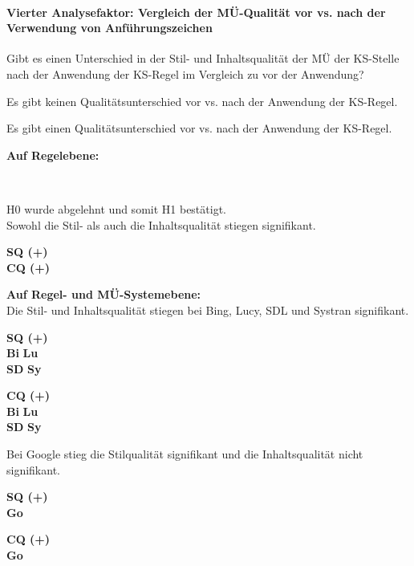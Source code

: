 \paragraph*{Vierter Analysefaktor: Vergleich der MÜ-Qualität vor vs. nach der Verwendung von Anführungszeichen}
\begin{description}[font=\normalfont\bfseries]
\item[Fragestellung:] Gibt es einen Unterschied in der Stil- und Inhaltsqualität der MÜ der KS-Stelle nach der Anwendung der KS-Regel im Vergleich zu vor der Anwendung?
\item [H0 --] Es gibt keinen Qualitätsunterschied vor vs. nach der Anwendung der KS-Regel.
\item [H1 --] Es gibt einen Qualitätsunterschied vor vs. nach der Anwendung der KS-Regel.
\newpage
\item [Resultat]
\end{description}
\noindent
\parbox[t]{.75\textwidth}{
\textbf{Auf Regelebene:}}\\
\noindent
\parbox[t]{.75\textwidth}{
H0 wurde abgelehnt und somit H1 bestätigt.\\
Sowohl die Stil- als auch die Inhaltsqualität stiegen signifikant.\\
}
\parbox[t]{.04\textwidth}{}
\colorbox{smGreen}{\parbox[t]{.2\textwidth}{
\textbf{SQ (+)}\\
\textbf{CQ (+)}\\
}}

\noindent
\parbox[t]{.75\textwidth}{
\textbf{Auf Regel- und MÜ-Systemebene:}\\
Die Stil- und Inhaltsqualität stiegen bei Bing, Lucy, SDL und Systran signifikant.
}
\parbox[t]{.04\textwidth}{}
\colorbox{smGreen}{\parbox[t]{.1\textwidth}{
\textbf{SQ (+)}\\
\textbf{Bi} \textbf{Lu}\\
\textbf{SD} \textbf{Sy}
}}
\colorbox{smGreen}{\parbox[t]{.1\textwidth}{
\textbf{CQ (+)}\\
\textbf{Bi} \textbf{Lu}\\
\textbf{SD} \textbf{Sy}
}}

\medskip
\noindent
\parbox[t]{.75\textwidth}{
Bei Google stieg die Stilqualität signifikant und die Inhaltsqualität nicht signifikant.
}
\parbox[t]{.04\textwidth}{}
\colorbox{smGreen}{\parbox[t]{.1\textwidth}{
\textbf{SQ (+)}\\
\textbf{Go}
}}
\parbox[t]{.1\textwidth}{
\textbf{CQ (+)}\\
\textbf{Go}
}

